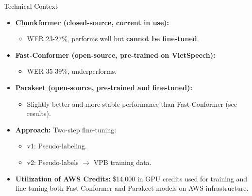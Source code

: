 \documentclass{beamer}
\begin{document}
\begin{frame}{Technical Context}
    \begin{itemize}
        \item \textbf{Chunkformer (closed-source, current in use):} 
            \begin{itemize}
                \item WER 23-27\%, performs well but \textbf{cannot be fine-tuned}.
            \end{itemize}
        \item \textbf{Fast-Conformer (open-source, pre-trained on VietSpeech):}
            \begin{itemize}
                \item WER 35-39\%, underperforms.
            \end{itemize}
        \item \textbf{Parakeet (open-source, pre-trained and fine-tuned):}
            \begin{itemize}
                \item Slightly better and more stable performance than Fast-Conformer (see results).
            \end{itemize}
        \item \textbf{Approach:} Two-step fine-tuning:
            \begin{itemize}
                \item v1: Pseudo-labeling.
                \item v2: Pseudo-labels $\to$ VPB training data.
            \end{itemize}
        \item \textbf{Utilization of AWS Credits:} \$14,000 in GPU credits used for training and fine-tuning both Fast-Conformer and Parakeet models on AWS infrastructure.
    \end{itemize}
\end{frame}
\end{document}
